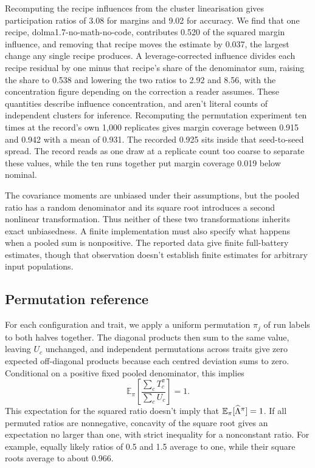 Recomputing the recipe influences from the cluster linearisation gives participation ratios of 3.08 for margins and 9.02 for accuracy. We find that one recipe, dolma1.7-no-math-no-code, contributes 0.520 of the squared margin influence, and removing that recipe moves the estimate by 0.037, the largest change any single recipe produces. A leverage-corrected influence divides each recipe residual by one minus that recipe's share of the denominator sum, raising the share to 0.538 and lowering the two ratios to 2.92 and 8.56, with the concentration figure depending on the correction a reader assumes. These quantities describe influence concentration, and aren't literal counts of independent clusters for inference. Recomputing the permutation experiment ten times at the record's own 1,000 replicates gives margin coverage between 0.915 and 0.942 with a mean of 0.931. The recorded 0.925 sits inside that seed-to-seed spread. The record reads as one draw at a replicate count too coarse to separate these values, while the ten runs together put margin coverage 0.019 below nominal.

The covariance moments are unbiased under their assumptions, but the pooled ratio has a random denominator and its square root introduces a second nonlinear transformation. Thus neither of these two transformations inherits exact unbiasedness. A finite implementation must also specify what happens when a pooled sum is nonpositive. The reported data give finite full-battery estimates, though that observation doesn't establish finite estimates for arbitrary input populations.

\subsection{Permutation reference}
For each configuration and trait, we apply a uniform permutation $\pi_j$ of run labels to both halves together. The diagonal products then sum to the same value, leaving $U_c$ unchanged, and independent permutations across traits give zero expected off-diagonal products because each centred deviation sums to zero. Conditional on a positive fixed pooled denominator, this implies
\begin{equation}
\mathbb E_\pi\left[\frac{\sum_cT_c^\pi}{\sum_cU_c}\right]=1.
\end{equation}
This expectation for the squared ratio doesn't imply that $\mathbb E_\pi[\widehat{\Lambda}^\pi]=1$. If all permuted ratios are nonnegative, concavity of the square root gives an expectation no larger than one, with strict inequality for a nonconstant ratio. For example, equally likely ratios of 0.5 and 1.5 average to one, while their square roots average to about 0.966.

